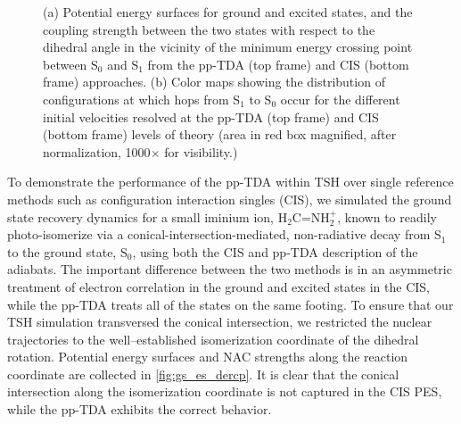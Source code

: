 \begin{figure}[h!]
\begin{subfigure}[b]{0.40\textwidth}
  \caption{ }
  \label{fig:hops}
  \end{subfigure}
  \caption{\footnotesize (a) Potential energy surfaces for ground and excited
  states, and the coupling strength between the two states with respect to the
  dihedral angle in the vicinity of the minimum energy crossing point between
  S$_0$ and S$_1$ from the pp-TDA (top frame) and CIS (bottom frame) approaches.
  (b) Color maps showing the distribution of configurations at which hops from
  S$_1$ to S$_0$ occur for the different initial velocities resolved at the
  pp-TDA (top frame) and CIS (bottom frame) levels of theory (area in red box
  magnified, after normalization, 1000$\times$ for visibility.)}
\end{figure}

To demonstrate the performance of the pp-TDA within TSH over single reference
methods such as configuration interaction singles (CIS), we simulated the ground
state recovery dynamics for a small iminium ion, H$_2$C=NH$_2^+$, known to
readily photo-isomerize via a conical-intersection-mediated, non-radiative decay
from S$_1$ to the ground state, S$_0$, using both the CIS and pp-TDA description
of the adiabats. The important difference between the two methods is in an
asymmetric treatment of electron correlation in the ground and excited states in
the CIS, while the pp-TDA treats all of the states on the same footing. To
ensure that our TSH simulation transversed the conical intersection, we
restricted the nuclear trajectories to the well--established isomerization
coordinate of the dihedral rotation.  Potential energy surfaces and NAC 
strengths along the reaction coordinate are collected in \cref{fig:gs_es_dercp}. 
It is clear that the conical intersection along the isomerization coordinate is
not captured in the CIS PES, while the pp-TDA exhibits the correct behavior.

